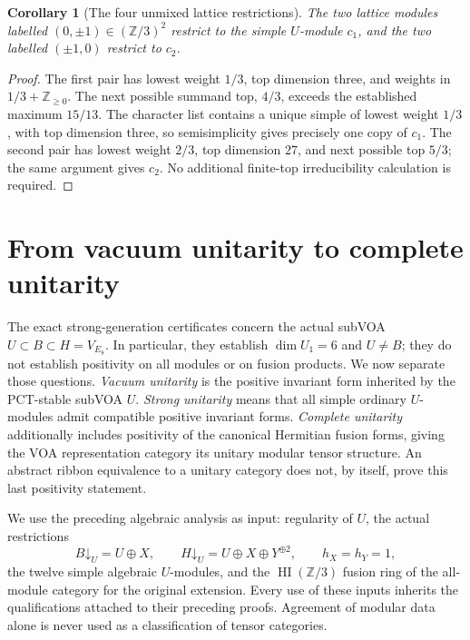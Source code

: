\documentclass[11pt,a4paper]{article}
\newtheorem{corollary}[theorem]{Corollary}
\theoremstyle{definition}
\DeclareMathOperator{\Rep}{Rep}
\DeclareMathOperator{\Com}{Com}
\DeclareMathOperator{\FPdim}{FPdim}
\renewcommand{\Vec}{\mathrm{Vec}}
\newcommand{\HH}{\mathcal H}
\newcommand{\artifact}[1]{\textnormal{\nolinkurl{#1}}}
\begin{document}
\begin{corollary}[The four unmixed lattice restrictions]
\label{cor:unmixed-lattice-restrictions}
The two lattice modules labelled $(0,\pm1)\in(\mathbb Z/3)^2$
restrict to the simple $U$-module $c_1$, and the two labelled
$(\pm1,0)$ restrict to $c_2$.
\end{corollary}
\begin{proof}
The first pair has lowest weight $1/3$, top dimension three, and
weights in $1/3+\mathbb Z_{\ge0}$. The next possible summand top,
$4/3$, exceeds the established maximum $15/13$. The character list
contains a unique simple of lowest weight $1/3$, with top dimension
three, so semisimplicity gives precisely one copy of $c_1$.
The second pair has lowest weight $2/3$, top dimension $27$, and
next possible top $5/3$; the same argument gives $c_2$.
No additional finite-top irreducibility calculation is required.
\end{proof}


\section{From vacuum unitarity to complete unitarity}
\label{sec:analytic-unitarity}

The exact strong-generation certificates concern the actual subVOA
$U\subset B\subset H=V_{E_8}$.  In particular, they establish
$\dim U_1=6$ and $U\ne B$; they do not establish positivity on all
modules or on fusion products.  We now separate those questions.
\emph{Vacuum unitarity} is the positive invariant form inherited by the
PCT-stable subVOA $U$.  \emph{Strong unitarity} means that all simple
ordinary $U$-modules admit compatible positive invariant forms.
\emph{Complete unitarity} additionally includes positivity of the
canonical Hermitian fusion forms, giving the VOA representation category
its unitary modular tensor structure.  An abstract ribbon equivalence to
a unitary category does not, by itself, prove this last positivity statement.

We use the preceding algebraic analysis as input: regularity of $U$,
the actual restrictions
\begin{equation}
 B\mathord\downarrow_U=U\oplus X,
 \qquad
 H\mathord\downarrow_U=U\oplus X\oplus Y^{\oplus2},
 \qquad h_X=h_Y=1,
 \label{eq:analytic-branching}
\end{equation}
the twelve simple algebraic $U$-modules, and the
$\operatorname{HI}(\mathbb Z/3)$ fusion ring of the all-module category
for the original extension.  Every use of these inputs inherits the
qualifications attached to their preceding proofs.  Agreement of modular
data alone is never used as a classification of tensor categories.
\end{document}

